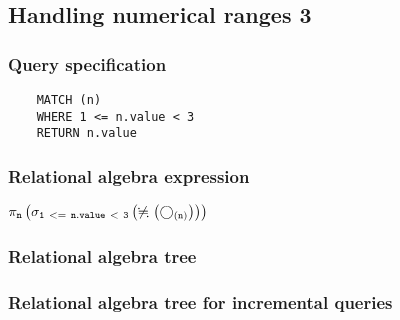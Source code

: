 	\subsection{Handling numerical ranges 3}

	\subsubsection*{Query specification}

	\begin{lstlisting}
	MATCH (n)
	WHERE 1 <= n.value < 3
	RETURN n.value
	\end{lstlisting}


	\subsubsection*{Relational algebra expression}

	$\projection{\var{n}} \left(\selection{\mathtt{1~<=~n.value~<~3}} \left(\alldifferent{} \left(\getvertices{n}{}\right)\right)\right)$

	\subsubsection*{Relational algebra tree}


	\subsubsection*{Relational algebra tree for incremental queries}

